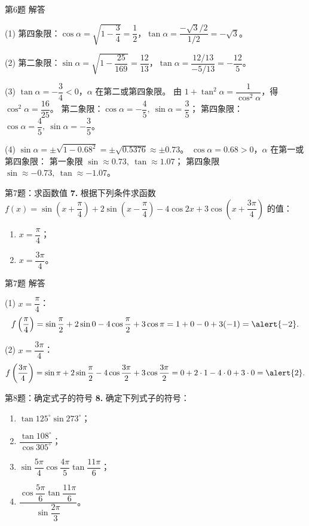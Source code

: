 \documentclass[10pt,aspectratio=169,serif]{beamer}
\begin{document}
\begin{frame}[t]{第6题 解答}
\begin{tcolorbox}[colback=orange!10,colframe=orange,title=\textbf{解}]
\small
(1) 第四象限：$\cos\alpha=\sqrt{1-\dfrac{3}{4}}=\dfrac{1}{2}$，$\tan\alpha=\dfrac{-\sqrt{3}/2}{1/2}=-\sqrt{3}$。

(2) 第二象限：$\sin\alpha=\sqrt{1-\dfrac{25}{169}}=\dfrac{12}{13}$，$\tan\alpha=\dfrac{12/13}{-5/13}=-\dfrac{12}{5}$。

(3) $\tan\alpha=-\dfrac{3}{4}<0$，$\alpha$ 在第二或第四象限。
由 $1+\tan^2\alpha=\dfrac{1}{\cos^2\alpha}$，得 $\cos^2\alpha=\dfrac{16}{25}$。
第二象限：$\cos\alpha=-\dfrac{4}{5},\ \sin\alpha=\dfrac{3}{5}$；
第四象限：$\cos\alpha=\dfrac{4}{5},\ \sin\alpha=-\dfrac{3}{5}$。

(4) $\sin\alpha=\pm\sqrt{1-0.68^2}=\pm\sqrt{0.5376}\approx\pm 0.73$。
$\cos\alpha=0.68>0$，$\alpha$ 在第一或第四象限：
第一象限 $\sin\approx 0.73,\ \tan\approx 1.07$；
第四象限 $\sin\approx -0.73,\ \tan\approx -1.07$。
\end{tcolorbox}
\end{frame}

\begin{frame}[t]{第7题：求函数值}
\textbf{7.} 根据下列条件求函数 $f(x)=\sin\left(x+\dfrac{\pi}{4}\right)+2\sin\left(x-\dfrac{\pi}{4}\right)-4\cos 2x+3\cos\left(x+\dfrac{3\pi}{4}\right)$ 的值：
\begin{enumerate}
  \item $x=\dfrac{\pi}{4}$；
  \item $x=\dfrac{3\pi}{4}$。
\end{enumerate}
\end{frame}

\begin{frame}[t]{第7题 解答}
\begin{tcolorbox}[colback=orange!10,colframe=orange,title=\textbf{解}]
(1) $x=\dfrac{\pi}{4}$：
\[
f\left(\frac{\pi}{4}\right)=\sin\frac{\pi}{2}+2\sin 0-4\cos\frac{\pi}{2}+3\cos\pi
=1+0-0+3(-1)=\alert{-2}.
\]

(2) $x=\dfrac{3\pi}{4}$：
\[
f\left(\frac{3\pi}{4}\right)=\sin\pi+2\sin\frac{\pi}{2}-4\cos\frac{3\pi}{2}+3\cos\frac{3\pi}{2}
=0+2\cdot 1-4\cdot 0+3\cdot 0=\alert{2}.
\]
\end{tcolorbox}
\end{frame}

\begin{frame}[t]{第8题：确定式子的符号}
\textbf{8.} 确定下列式子的符号：
\begin{enumerate}
  \item $\tan 125^\circ\sin 273^\circ$；
  \item $\dfrac{\tan 108^\circ}{\cos 305^\circ}$；
  \item $\sin\dfrac{5\pi}{4}\cos\dfrac{4\pi}{5}\tan\dfrac{11\pi}{6}$；
  \item $\dfrac{\cos\dfrac{5\pi}{6}\tan\dfrac{11\pi}{6}}{\sin\dfrac{2\pi}{3}}$。
\end{enumerate}
\end{frame}
\end{document}
